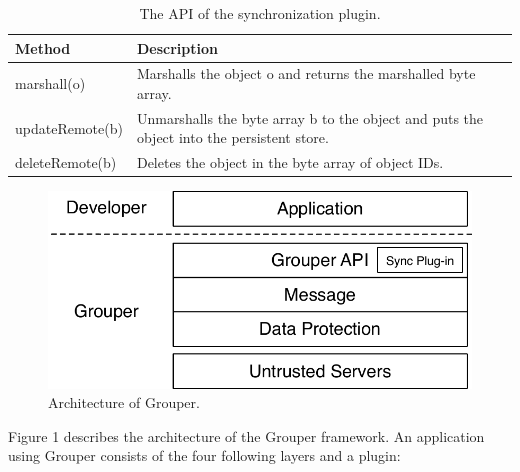 \documentclass[twocolumn,10pt]{article}
\begin{document}
\begin{table}[t]
	\centering
	\caption{The API of the synchronization plugin.}
	\label{my-label}
	\begin{tabular}{ll}
		\hline
		\textbf{Method} & \textbf{Description} \\ \hline
		marshall(o) & Marshalls the object o and returns the marshalled byte array. \\
		updateRemote(b) & Unmarshalls the byte array b to the object and puts the object into the persistent store. \\ 
		deleteRemote(b) & Deletes the object in the byte array of object IDs.\\ \hline
	\end{tabular}
\end{table}

\begin{figure}[t]
	\centering
	\includegraphics[scale=0.45]{architecture}
	\caption{Architecture of Grouper.}
\end{figure}

Figure 1 describes the architecture of the Grouper framework. 
An application using Grouper consists of the four following layers and a plugin:
\end{document}

